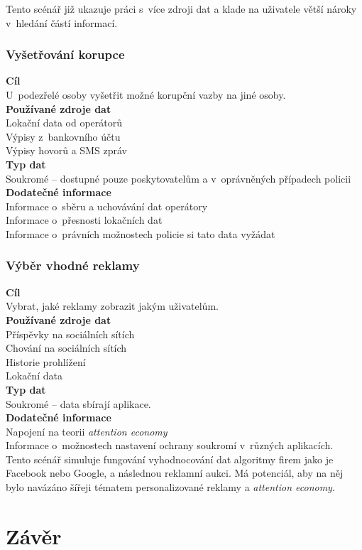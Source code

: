 Tento scénář již ukazuje práci s~více zdroji dat a klade na uživatele větší nároky v~hledání částí informací.


\subsubsection*{Vyšetřování korupce}
\textbf{Cíl}\\
U~podezřelé osoby vyšetřit možné korupční vazby na jiné osoby.\\
\textbf{Používané zdroje dat}\\
Lokační data od operátorů\\
Výpisy z~bankovního účtu\\
Výpisy hovorů a SMS zpráv\\
\textbf{Typ dat}\\
Soukromé -- dostupné pouze poskytovatelům a v~oprávněných případech policii\\
\textbf{Dodatečné informace}\\
Informace o~sběru a uchovávání dat operátory\\
Informace o~přesnosti lokačních dat\\
Informace o~právních možnostech policie si tato data vyžádat\\


\subsubsection*{Výběr vhodné reklamy} 
\textbf{Cíl}\\
Vybrat, jaké reklamy zobrazit jakým uživatelům.\\
\textbf{Používané zdroje dat}\\
Příspěvky na sociálních sítích\\
Chování na sociálních sítích\\
Historie prohlížení\\
Lokační data\\
\textbf{Typ dat}\\
Soukromé -- data sbírají aplikace.\\
\textbf{Dodatečné informace}\\
Napojení na teorii \textit{attention economy}\\
Informace o~možnostech nastavení ochrany soukromí v~různých aplikacích.\\

Tento scénář simuluje fungování vyhodnocování dat algoritmy firem jako je Facebook nebo Google, a následnou reklamní aukci. Má potenciál, aby na něj bylo navázáno šířeji tématem personalizované reklamy a \textit{attention economy}. 

\section*{Závěr}
